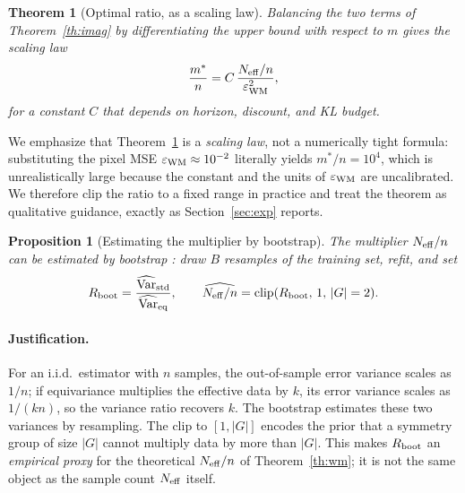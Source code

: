 \documentclass[sigconf,anonymous]{acmart}
\newtheorem{theorem}{Theorem}
\newtheorem{proposition}{Proposition}
\begin{document}
\begin{theorem}[Optimal ratio, as a scaling law]\label{th:ratio}
Balancing the two terms of Theorem~\ref{th:imag} by differentiating the upper
bound with respect to $m$ gives the scaling law
\begin{equation}
  \frac{m^*}{n}=C\,\frac{N_{\rm eff}/n}{\varepsilon_{\rm WM}^{2}},
\end{equation}
for a constant $C$ that depends on horizon, discount, and KL budget.
\end{theorem}

We emphasize that Theorem~\ref{th:ratio} is a \emph{scaling law}, not a
numerically tight formula: substituting the pixel MSE
$\varepsilon_{\rm WM}\approx10^{-2}$ literally yields $m^*/n=10^4$, which is
unrealistically large because the constant and the units of
$\varepsilon_{\rm WM}$ are uncalibrated. We therefore clip the ratio to a
fixed range in practice and treat the theorem as qualitative guidance,
exactly as Section~\ref{sec:exp} reports.

\begin{proposition}[Estimating the multiplier by bootstrap]\label{prop:meff}
The multiplier $N_{\rm eff}/n$ can be estimated by bootstrap
\cite{bootstrap1993}: draw $B$ resamples of the training set, refit, and set
\begin{equation}
  R_{\rm boot}=\frac{\widehat{\operatorname{Var}}_{\rm std}}{\widehat{\operatorname{Var}}_{\rm eq}},
  \qquad
  \widehat{N_{\rm eff}/n}=\operatorname{clip}(R_{\rm boot},\,1,\,|G|=2).
\end{equation}
\end{proposition}

\paragraph{Justification.}
For an i.i.d.\ estimator with $n$ samples, the out-of-sample error variance
scales as $1/n$; if equivariance multiplies the effective data by $k$, its
error variance scales as $1/(kn)$, so the variance ratio recovers $k$. The
bootstrap \cite{bootstrap1993} estimates these two variances by resampling.
The clip to $[1,|G|]$ encodes the prior that a symmetry group of size $|G|$
cannot multiply data by more than $|G|$. This makes $R_{\rm boot}$ an
\emph{empirical proxy} for the theoretical $N_{\rm eff}/n$ of
Theorem~\ref{th:wm}; it is not the same object as the sample count $N_{\rm eff}$ itself.

\end{document}
